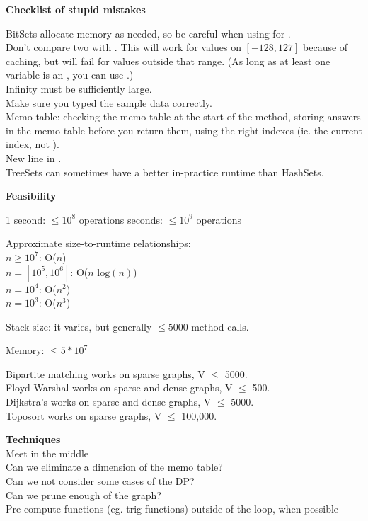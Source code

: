 
\textbf{Checklist of stupid mistakes}

\indent BitSets allocate memory as-needed, so be careful when using  for . \\
\indent Don't compare two  with \inline{==}. This will work for values on $[-128, 127]$ because of caching, but will fail for values outside that range. (As long as at least one variable is an , you can use \inline{==}.) \\
\indent Infinity must be sufficiently large. \\
\indent Make sure you typed the sample data correctly. \\
\indent Memo table: checking the memo table at the start of the method, storing answers in the memo table before you return them, using the right indexes (ie. the current index, not ). \\
\indent New line in . \\ 
\indent TreeSets can sometimes have a better in-practice runtime than HashSets. 

\textbf{Feasibility}

1 second: $\leq 10^8$ operations \indent{} seconds: $\leq 10^9$ operations

Approximate size-to-runtime relationships: \\
\indent $n \geq 10^7$: O($n$) \\
\indent $n = [10^5, 10^6]$: O($n\text{ log}(n)$) \\
\indent $n = 10^4$: O($n^2$) \\
\indent $n = 10^3$: O($n^3$)

Stack size: it varies, but generally $\leq 5000$ method calls.

Memory: $\leq 5*10^7$

Bipartite matching works on sparse graphs, V $\leq$ 5000. \\
Floyd-Warshal works on sparse and dense graphs, V $\leq$ 500. \\
Dijkstra’s works on sparse and dense graphs, V $\leq$ 5000. \\
Toposort works on sparse graphs, V $\leq$ 100,000.

\textbf{Techniques} \\ 
Meet in the middle \\
Can we eliminate a dimension of the memo table? \\
Can we not consider some cases of the DP? \\
Can we prune enough of the graph? \\
Pre-compute functions (eg. trig functions) outside of the loop, when possible 

